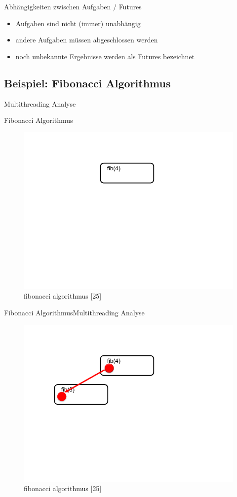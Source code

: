 \documentclass{beamer}
\begin{document}
\begin{frame}{Abh\"angigkeiten zwischen Aufgaben / Futures}
\begin{itemize}
\item Aufgaben sind nicht (immer) unabh\"angig
\item andere Aufgaben m\"ussen abgeschlossen werden
\item noch unbekannte Ergebnisse werden als Futures bezeichnet
\end{itemize}
\end{frame}






\subsection{Beispiel: Fibonacci Algorithmus}{Multithreading Analyse}

\begin{frame}{Fibonacci Algorithmus}

\begin{figure}
\centering
\includegraphics[width=0.7\columnwidth]{./assets/Slide039.png}
\caption{fibonacci algorithmus \cite{Herlihy1}[25]}
\label{fig:my_label}
\end{figure}

\end{frame}

\begin{frame}{Fibonacci Algorithmus}{Multithreading Analyse}

\begin{figure}
\centering
\includegraphics[width=0.7\columnwidth]{./assets/Slide040.png}
\caption{fibonacci algorithmus \cite{Herlihy1}[25]}
\label{fig:my_label}
\end{figure}

\end{frame}
\end{document}
